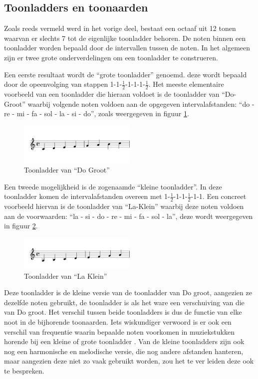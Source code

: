 \subsection{Toonladders en toonaarden}
Zoals reeds vermeld werd in het vorige deel, bestaat een octaaf uit 12 tonen waarvan er slechts 7 tot de eigenlijke toonladder behoren. De noten binnen een toonladder worden bepaald door de intervallen tussen de noten. In het algemeen zijn er twee grote onderverdelingen om een toonladder te construeren. 

Een eerste resultaat wordt de ``grote toonladder'' genoemd. deze wordt bepaald door de opeenvolging van stappen 1-1-$\frac{1}{2}$-1-1-1-$\frac{1}{2}$. Het meeste elementaire voorbeeld van een toonladder die hieraan voldoet is de toonladder van ``Do-Groot'' waarbij volgende noten voldoen aan de opgegeven intervalafstanden: ``do - re - mi - fa - sol - la - si - do'', zoals weergegeven in figuur \ref{figuur:do_groot}. 

\begin{figure}[!ht]
  \centering
  \includegraphics[width=0.5\textwidth]{1_Muzikale_Achtergrond/do_groot}
  \caption{Toonladder van ``Do Groot''}
  \label{figuur:do_groot}
\end{figure}

Een tweede mogelijkheid is de zogenaamde ``kleine toonladder''. In deze toonladder komen de intervalafstanden overeen met 1-$\frac{1}{2}$-1-1-$\frac{1}{2}$-1-1. Een concreet voorbeeld hiervan is de toonladder van ``La-Klein'' waarbij deze noten voldoen aan de voorwaarden: ``la - si - do - re - mi - fa - sol - la'', deze wordt weergegeven in figuur \ref{figuur:la_klein}. 

\begin{figure}[!ht]
  \centering
  \includegraphics[width=0.5\textwidth]{1_Muzikale_Achtergrond/la_klein}
  \caption{Toonladder van ``La Klein''}
  \label{figuur:la_klein}
\end{figure}

Deze toonladder is de kleine versie van de toonladder van Do groot, aangezien ze dezelfde noten gebruikt, de toonladder is als het ware een verschuiving van die van Do groot. Het verschil tussen beide toonladders is dus de functie van elke noot in de bijhorende toonaarden. Iets wiskundiger verwoord is er ook een verschil van frequentie waarin bepaalde noten voorkomen in muziekstukken horende bij een kleine of grote toonladder \cite{book:musicAndProbability}. Van de kleine toonladders zijn ook nog een harmonische en melodische versie, die nog andere afstanden hanteren, maar aangezien deze niet zo vaak gebruikt worden, zou het te ver leiden deze ook te bespreken.

